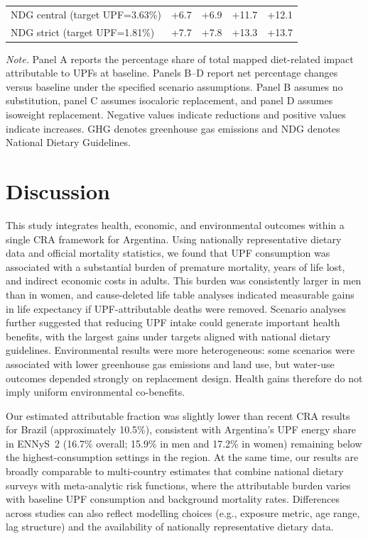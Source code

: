 ﻿\documentclass{article}
\newcommand{\tabnote}[1]{%
  \vspace{0.06cm}%
  {\footnotesize\setstretch{1}\par\raggedright\textit{Note.} #1\par}%
}
\begin{document}
{\begin{longtable}[]{@{}lrrrr@{}}
NDG central (target UPF=3.63\%) & +6.7 & +6.9 & +11.7 & +12.1 \\
NDG strict (target UPF=1.81\%) & +7.7 & +7.8 & +13.3 & +13.7 \\
\end{longtable}
\tabnote{Panel A reports the percentage share of total mapped diet-related impact attributable to UPFs at baseline. Panels B--D report net percentage changes versus baseline under the specified scenario assumptions. Panel B assumes no substitution, panel C assumes isocaloric replacement, and panel D assumes isoweight replacement. Negative values indicate reductions and positive values indicate increases. GHG denotes greenhouse gas emissions and NDG denotes National Dietary Guidelines.}
}

\section{Discussion}\label{discussion}

This study integrates health, economic, and environmental outcomes within a single CRA framework for Argentina. Using nationally representative dietary data and official mortality statistics, we found that UPF consumption was associated with a substantial burden of premature mortality, years of life lost, and indirect economic costs in adults. This burden was consistently larger in men than in women, and cause-deleted life table analyses indicated measurable gains in life expectancy if UPF-attributable deaths were removed. Scenario analyses further suggested that reducing UPF intake could generate important health benefits, with the largest gains under targets aligned with national dietary guidelines. Environmental results were more heterogeneous: some scenarios were associated with lower greenhouse gas emissions and land use, but water-use outcomes depended strongly on replacement design. Health gains therefore do not imply uniform environmental co-benefits.

Our estimated attributable fraction was slightly lower than recent CRA results for Brazil (approximately 10.5\%),\cite{Nilson2023} consistent with Argentina's UPF energy share in ENNyS~2 (16.7\% overall; 15.9\% in men and 17.2\% in women) remaining below the highest-consumption settings in the region. At the same time, our results are broadly comparable to multi-country estimates that combine national dietary surveys with meta-analytic risk functions, where the attributable burden varies with baseline UPF consumption and background mortality rates.\cite{Nilson2025EightCountries} Differences across studies can also reflect modelling choices (e.g., exposure metric, age range, lag structure) and the availability of nationally representative dietary data.
\end{document}
